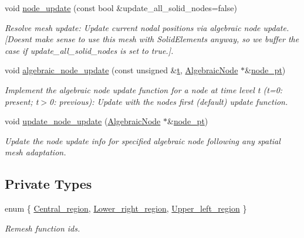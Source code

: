 \begin{DoxyCompactItemize}
void \hyperlink{classoomph_1_1AlgebraicRefineableQuarterTubeMesh_af521c0a76cf0bd14692979bd7747507d}{node\+\_\+update} (const bool \&update\+\_\+all\+\_\+solid\+\_\+nodes=false)
\begin{DoxyCompactList}\small\item\em Resolve mesh update\+: Update current nodal positions via algebraic node update. \mbox{[}Doesn\textquotesingle{}t make sense to use this mesh with Solid\+Elements anyway, so we buffer the case if update\+\_\+all\+\_\+solid\+\_\+nodes is set to true.\mbox{]}. \end{DoxyCompactList}\item 
void \hyperlink{classoomph_1_1AlgebraicRefineableQuarterTubeMesh_af98a0aaff29c54ffa35f72f7dcf6b8c7}{algebraic\+\_\+node\+\_\+update} (const unsigned \&\hyperlink{cfortran_8h_af6f0bd3dc13317f895c91323c25c2b8f}{t}, \hyperlink{classoomph_1_1AlgebraicNode}{Algebraic\+Node} $\ast$\&\hyperlink{classoomph_1_1AlgebraicMesh_aedeebbe95d2f8e67e9939cecd1be3933}{node\+\_\+pt})
\begin{DoxyCompactList}\small\item\em Implement the algebraic node update function for a node at time level t (t=0\+: present; t$>$0\+: previous)\+: Update with the node\textquotesingle{}s first (default) update function. \end{DoxyCompactList}\item 
void \hyperlink{classoomph_1_1AlgebraicRefineableQuarterTubeMesh_a7ed9f4ce0442a6f962a1561318542a67}{update\+\_\+node\+\_\+update} (\hyperlink{classoomph_1_1AlgebraicNode}{Algebraic\+Node} $\ast$\&\hyperlink{classoomph_1_1AlgebraicMesh_aedeebbe95d2f8e67e9939cecd1be3933}{node\+\_\+pt})
\begin{DoxyCompactList}\small\item\em Update the node update info for specified algebraic node following any spatial mesh adaptation. \end{DoxyCompactList}\end{DoxyCompactItemize}
\subsection*{Private Types}
\begin{DoxyCompactItemize}
\item 
enum \{ \hyperlink{classoomph_1_1AlgebraicRefineableQuarterTubeMesh_a215c0430765f10553590b0d47203393da516de7eb4676b7b88ebd50f5967a5579}{Central\+\_\+region}, 
\hyperlink{classoomph_1_1AlgebraicRefineableQuarterTubeMesh_a215c0430765f10553590b0d47203393da05c833cf7edf44c3bd94251628400da3}{Lower\+\_\+right\+\_\+region}, 
\hyperlink{classoomph_1_1AlgebraicRefineableQuarterTubeMesh_a215c0430765f10553590b0d47203393da4e534010f6f42e81a575935509ace9ab}{Upper\+\_\+left\+\_\+region}
 \}\begin{DoxyCompactList}\small\item\em Remesh function ids. \end{DoxyCompactList}
\end{DoxyCompactItemize}
